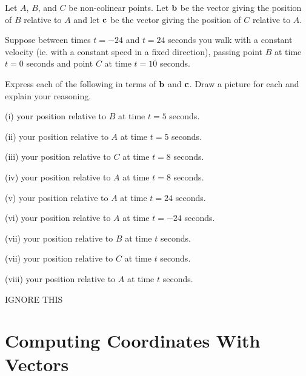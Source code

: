 \documentclass{ximera}
\begin{document}
\begin{question}  \label{Qtete4r3:Vectors}
Let $A$, $B$, and $C$ be non-colinear points. Let ${\bf b}$ be the vector giving the position of $B$ relative to $A$ and let ${\bf c}$ be the vector giving the position of $C$ relative to $A$. 

Suppose between times $t=-24$ and $t=24$ seconds you walk with a constant velocity (ie. with a constant speed in a fixed direction), passing point $B$ at time $t=0$ seconds and point $C$ at time $t=10$ seconds.

Express each of the following in terms of ${\bf b}$ and ${\bf c}$. Draw a picture for each and explain your reasoning.

(i) your position relative to $B$ at time $t=5$ seconds.

(ii) your position relative to $A$ at time $t=5$ seconds.

(iii) your position relative to $C$  at time $t=8$ seconds.

(iv) your position relative to $A$  at time $t=8$ seconds.

(v) your position relative to $A$  at time $t=24$ seconds.

(vi) your position relative to $A$  at time $t=-24$ seconds.

(vii)  your position relative to $B$  at time $t$ seconds.

(vii)  your position relative to $C$  at time $t$ seconds.

(viii)  your position relative to $A$  at time $t$ seconds.

\end{question}





IGNORE THIS

 
\begin{onlineOnly}
    \begin{center}
\end{center}
\end{onlineOnly}



\section{Computing Coordinates With Vectors}
\end{document}
